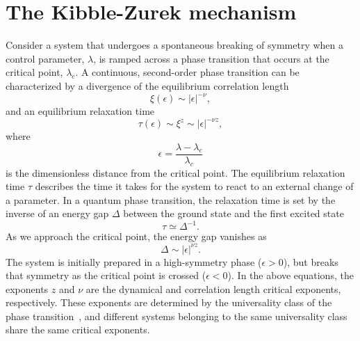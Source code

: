 \section{The Kibble-Zurek mechanism}\label{sec: the-KZM}
Consider a system that undergoes a spontaneous breaking of symmetry when a
control parameter, \( \lambda \), is ramped across a phase transition that
occurs at the critical point, \( \lambda_c \).
A continuous, second-order phase transition can be characterized by a divergence
of the equilibrium correlation length
\begin{equation}
    \xi(\epsilon) \sim |\epsilon|^{-\nu},
\end{equation}
and an equilibrium relaxation time
\begin{equation}
    \tau(\epsilon) \sim \xi^z \sim |\epsilon|^{-\nu z},
    \label{eq: equil-relax-time}
\end{equation}
where
\begin{equation}
    \epsilon = \frac{\lambda - \lambda_c}{\lambda_c}
\end{equation}
is the dimensionless distance from the critical point.
The equilibrium relaxation time \( \tau \) describes the time it takes for the
system to react to an external change of a parameter.
In a quantum phase transition, the relaxation time is set by the inverse of an
energy gap \( \Delta \) between the ground state and the first excited
state~\cite{Zurek2005, Damski2006}
\begin{equation}
    \tau \simeq \Delta^{-1}.
\end{equation}
As we approach the critical point, the energy gap vanishes as
\begin{equation}
    \Delta \sim |\epsilon|^{\nu z}.
\end{equation}
The system is initially prepared in a high-symmetry phase (\(  \epsilon > 0 \)),
but breaks that symmetry as the critical point is crossed (\(  \epsilon < 0 \)).
In the above equations, the exponents \(  z \) and \( \nu \) are the dynamical
and correlation length critical exponents, respectively.
These exponents are determined by the universality class of the phase
transition~\cite{Sachdev2011}, and different systems belonging to the same
universality class share the same critical exponents.


